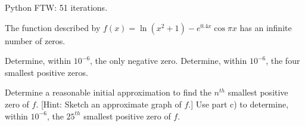 \documentclass[../../../../Assignments]{subfiles}
\begin{document}
\begin{solution}
    Python FTW: 51 iterations.
\end{solution}

\begin{exercise}
    The function described by \(f(x) = \ln(x^2 + 1) - e^{\num{0.4} x} \cos{\pi
    x}\) has an infinite number of zeros.

    \begin{tasks}
        \task Determine, within \(10^{-6}\), the only negative zero.
        \task Determine, within \(10^{-6}\), the four smallest positive zeros.

        \task Determine a reasonable initial approximation to find the
            \(n^{th}\) smallest positive zero of \(f\). [Hint: Sketch an
            approximate graph of \(f\).]
        \task Use part c) to determine, within \(10^{-6}\), the \(25^{th}\)
            smallest positive zero of \(f\).
    \end{tasks}
\end{exercise}
\end{document}
